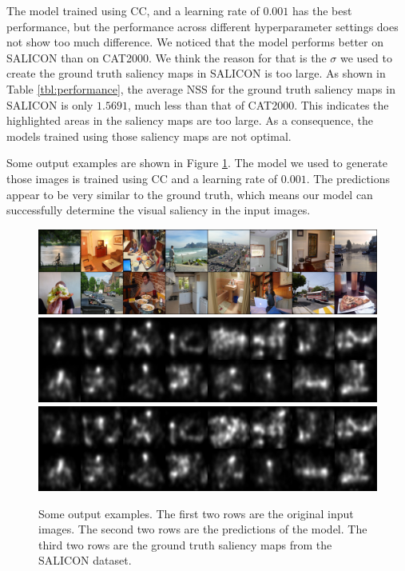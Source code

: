 \documentclass[12pt]{article}
\begin{document}
The model trained using CC, and a learning rate of $0.001$ has the best performance, but the performance
across different hyperparameter settings does not show too much difference. We noticed that
the model performs better on SALICON than on CAT2000. We think the reason for that is the $\sigma$
we used to create the ground truth saliency maps in SALICON is too large. As shown in Table \ref{tbl:performance},
the average NSS for the ground truth saliency maps in SALICON is only $1.5691$, much less than that
of CAT2000. This indicates the highlighted areas in the saliency maps are too large. As a consequence,
the models trained using those saliency maps are not optimal.

Some output examples are shown in Figure \ref{img:output_example}. The model we used to generate those images is trained using CC and a learning rate of $0.001$. The predictions appear to be
very similar to the ground truth, which means our model can successfully determine the visual saliency
in the input images.

\begin{figure}[h!]
    \begin{adjustwidth}{-0.6cm}{}
    \centering
    \includegraphics[width=7in]{imgs/out_original_image.png}
    \includegraphics[width=7in]{imgs/out_prediction.png}
    \includegraphics[width=7in]{imgs/out_groundtruth.png}
    \end{adjustwidth}
    \caption{Some output examples. The first two rows are the original input images.
    The second two rows are the predictions of the model. The third two rows are the
    ground truth saliency maps from the SALICON dataset.}
    \label{img:output_example}
\end{figure}
\end{document}
